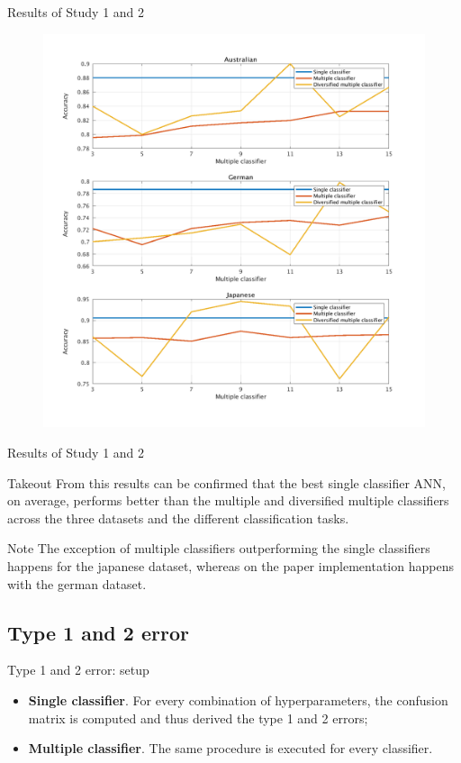 \documentclass[12pt]{beamer}
\begin{document}
\begin{frame}{Results of Study 1 and 2}
    \begin{figure}
    \includegraphics[width=0.6\linewidth]{../../data/graph.png}
    \end{figure}
\end{frame}

\begin{frame}{Results of Study 1 and 2}
  \begin{block}{Takeout}
    From this results can be confirmed that the best single classifier ANN, on
    average, performs
    better than the multiple and diversified multiple classifiers across the three
    datasets and the different classification tasks.
  \end{block}

  \begin{alertblock}{Note}
    The exception of multiple classifiers outperforming the single classifiers
    happens for the japanese dataset, whereas on the paper implementation happens
    with the german dataset.
  \end{alertblock}
\end{frame}

\subsection{Type 1 and 2 error}
\begin{frame}{Type 1 and 2 error: setup}
\begin{itemize}
  \item \textbf{Single classifier}. For every combination of hyperparameters, the
    confusion matrix is computed and thus derived the type 1 and 2 errors;
  \item \textbf{Multiple classifier}. The same procedure is executed for every
    classifier.
\end{itemize}
\end{frame}
\end{document}
